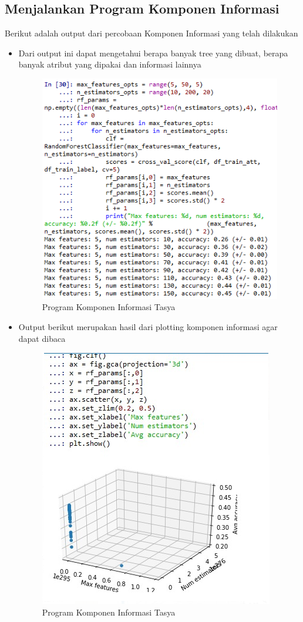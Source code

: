 \subsection{Menjalankan Program Komponen Informasi}
Berikut adalah output dari percobaan Komponen Informasi yang telah dilakukan
\begin{itemize}
\item Dari output ini dapat mengetahui berapa banyak tree yang dibuat, berapa banyak atribut yang dipakai dan informasi lainnya
\begin{figure}[ht]
\centering
\includegraphics[scale=0.5]{figures/ki1.png}
\caption{Program Komponen Informasi Tasya}
\label{Praktek}
\end{figure}

\item Output berikut merupakan hasil dari plotting komponen informasi agar dapat dibaca
\begin{figure}[ht]
\centering
\includegraphics[scale=0.5]{figures/ki2.png}
\caption{Program Komponen Informasi Tasya}
\label{Praktek}
\end{figure}
\end{itemize}

